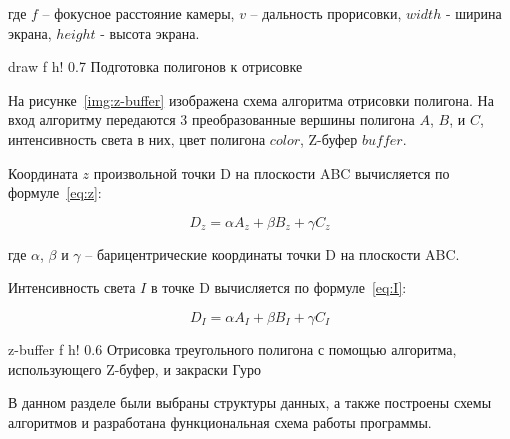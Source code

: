 \noindent где $f$ -- фокусное расстояние камеры, $v$ -- дальность прорисовки, $width$ - ширина экрана, $height$ - высота экрана.

\FloatBarrier
{}
{draw} %
{f} %
{h!} %
{0.7\textwidth} %
{Подготовка полигонов к отрисовке} %
\FloatBarrier


На рисунке~\ref{img:z-buffer} изображена схема алгоритма отрисовки полигона. На вход алгоритму передаются 3 преобразованные вершины полигона $A$, $B$, и $C$, интенсивность света в них, цвет полигона $color$, Z-буфер $buffer$.

Координата $z$ произвольной точки D на плоскости ABC вычисляется по формуле~\ref{eq:z}:

\begin{equation}
	\label{eq:z}
	D_z = \alpha A_z + \beta B_z + \gamma C_z
\end{equation}

\noindent где $\alpha$, $\beta$ и $\gamma$ -- барицентрические координаты точки D на плоскости ABC.

Интенсивность света $I$ в точке D вычисляется по формуле~\ref{eq:I}:

\begin{equation}
	\label{eq:I}
	D_I = \alpha A_I + \beta B_I + \gamma C_I
\end{equation}

\FloatBarrier
{}
{z-buffer} %
{f} %
{h!} %
{0.6\textwidth} %
{Отрисовка треугольного полигона с помощью алгоритма, использующего Z-буфер, и закраски Гуро} %
\FloatBarrier


В данном разделе были выбраны структуры данных, а также построены схемы алгоритмов и разработана функциональная схема работы программы.

